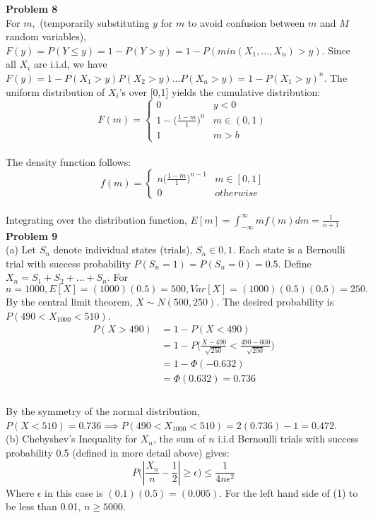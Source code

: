 \documentclass[letterpaper,12pt]{article}
\theoremstyle{definition}
\begin{document}
\noindent\textbf{Problem 8}\\
For $m,$ (temporarily substituting $y$ for $m$ to avoid confusion between $m$ and $M$ random variables), $F(y) = P(Y \leq y) = 1-P(Y> y) = 1-P(min(X_1,...,X_n) > y).$ Since all $X_i$ are i.i.d, we have $F(y) = 1-P(X_1 > y)P(X_2>y)...P(X_n>y) = 1 - P(X_1 > y)^n.$ The uniform distribution of $X_i$'s over [0,1] yields the cumulative distribution:
\begin{equation*}
F(m)=
\begin{cases}
0 & y < 0\\
1-\Big(\frac{1-m}{1}\Big)^n & m \in (0, 1)\\
1 & m>b
\end{cases}
\end{equation*}\\
The density function follows:
\begin{equation*}
f(m)=
\begin{cases}
n\Big(\frac{1-m}{1}\Big)^{n-1} & m \in [0,1]\\
0 & otherwise
\end{cases}
\end{equation*}\\
Integrating over the distribution function, $E[m]=\int_{-\infty}^{\infty}mf(m)dm = \frac{1}{n+1}$\\

\noindent\textbf{Problem 9}\\
(a) Let $S_n$ denote individual states (trials), $S_n \in {0,1}$. Each state is a Bernoulli trial with success probability $P(S_n = 1) = P(S_n = 0) = 0.5$. Define $X_n = S_1 + S_2 + ... + S_n$. For $n=1000, E[X] = (1000)(0.5) = 500, Var[X] = (1000)(0.5)(0.5) = 250.$ By the central limit theorem, $X \sim N(500,250)$. The desired probability is $P(490<X_{1000}<510)$.
\begin{align*}
P(X>490) &= 1-P(X<490)\\
&= 1-P\Bigg(\frac{X-490}{\sqrt{250}} < \frac{490-600}{\sqrt{250}}\Bigg)\\
&= 1-\Phi(-0.632)\\
&= \Phi(0.632) = 0.736\\
\end{align*}\\
By the symmetry of the normal distribution, $P(X<510) = 0.736 \implies P(490<X_{1000}<510) = 2(0.736) - 1 = 0.472$.\newline\\
(b) Chebyshev's Inequality for $X_n$, the sum of $n$ i.i.d Bernoulli trials with success probability 0.5 (defined in more detail above) gives:
\begin{equation}
P\Bigg(\left|\frac{X_n}{n} - \frac{1}{2}\right| \geq \epsilon \Bigg) \leq \frac{1}{4n\epsilon^2}
\end{equation}
Where $\epsilon$ in this case is $(0.1)(0.5) = (0.005)$. For the left hand side of (1) to be less than 0.01, $n \geq 5000$.\\
\end{document}
